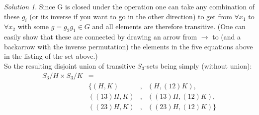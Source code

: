 \documentclass[a4paper,twoside=false,abstract=false,numbers=noenddot,
titlepage=false,headings=small,parskip=half,version=last]{scrartcl}
\theoremstyle{definition}
\theoremstyle{remark}
\newtheorem*{solution}{Solution}
\begin{document}
\begin{solution}
Since G is closed under the operation one can take any combination of these
$g_i$ (or its inverse if you want to go in the other direction) to get from
$\forall x_1$ to $\forall x_2$ with some $g=g_2g_1 \in G$ and 
all elements are therefore transitive. (One can easily show that these are
connected by drawing an arrow from $\rightarrow$ to (and a backarrow with the
inverse permutation) the elements in the five equations above in the 
listing of the set above.)\\

So the resulting disjoint union of transitive $S_3$-sets being simply (without
union):\\
\begin{align*}
    S_3/H \times S_3/K  &=        & &\\
                        &\{  (H,K)&,& (    H,(12)K), \\
                        &((13)H,K)&,& ((13)H,(12)K), \\
                        &((23)H,K)&,& ((23)H,(12)K)\}
\end{align*}

\end{solution}

\end{document}

